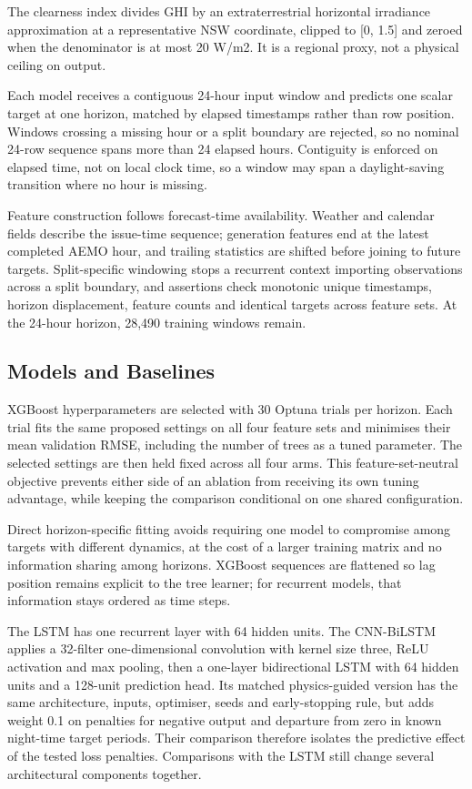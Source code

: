 The clearness index divides GHI by an extraterrestrial horizontal irradiance approximation at a representative NSW coordinate, clipped to [0, 1.5] and zeroed when the denominator is at most 20 W/m2. It is a regional proxy, not a physical ceiling on output.

Each model receives a contiguous 24-hour input window and predicts one scalar target at one horizon, matched by elapsed timestamps rather than row position. Windows crossing a missing hour or a split boundary are rejected, so no nominal 24-row sequence spans more than 24 elapsed hours. Contiguity is enforced on elapsed time, not on local clock time, so a window may span a daylight-saving transition where no hour is missing.

Feature construction follows forecast-time availability. Weather and calendar fields describe the issue-time sequence; generation features end at the latest completed AEMO hour, and trailing statistics are shifted before joining to future targets. Split-specific windowing stops a recurrent context importing observations across a split boundary, and assertions check monotonic unique timestamps, horizon displacement, feature counts and identical targets across feature sets. At the 24-hour horizon, 28,490 training windows remain.

\subsection{Models and Baselines}

XGBoost hyperparameters are selected with 30 Optuna trials per horizon. Each trial fits the same proposed settings on all four feature sets and minimises their mean validation RMSE, including the number of trees as a tuned parameter. The selected settings are then held fixed across all four arms. This feature-set-neutral objective prevents either side of an ablation from receiving its own tuning advantage, while keeping the comparison conditional on one shared configuration.

Direct horizon-specific fitting avoids requiring one model to compromise among targets with different dynamics, at the cost of a larger training matrix and no information sharing among horizons. XGBoost sequences are flattened so lag position remains explicit to the tree learner; for recurrent models, that information stays ordered as time steps.

The LSTM has one recurrent layer with 64 hidden units. The CNN-\allowbreak{}BiLSTM applies a 32-filter one-dimensional convolution with kernel size three, ReLU activation and max pooling, then a one-layer bidirectional LSTM with 64 hidden units and a 128-unit prediction head. Its matched physics-guided version has the same architecture, inputs, optimiser, seeds and early-stopping rule, but adds weight 0.1 on penalties for negative output and departure from zero in known night-time target periods. Their comparison therefore isolates the predictive effect of the tested loss penalties. Comparisons with the LSTM still change several architectural components together.

